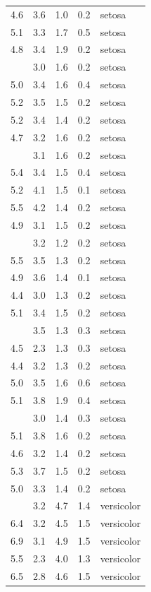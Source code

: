 \documentclass[
  12pt,
]{krantz}
\theoremstyle{definition}
\theoremstyle{definition}
\theoremstyle{definition}
\theoremstyle{definition}
\theoremstyle{remark}
\begin{document}
\begin{longtable}[t]{rrrrl}
4.6 & 3.6 & 1.0 & 0.2 & setosa\\
5.1 & 3.3 & 1.7 & 0.5 & setosa\\
4.8 & 3.4 & 1.9 & 0.2 & setosa\\
\addlinespace
5.0 & 3.0 & 1.6 & 0.2 & setosa\\
5.0 & 3.4 & 1.6 & 0.4 & setosa\\
5.2 & 3.5 & 1.5 & 0.2 & setosa\\
5.2 & 3.4 & 1.4 & 0.2 & setosa\\
4.7 & 3.2 & 1.6 & 0.2 & setosa\\
\addlinespace
4.8 & 3.1 & 1.6 & 0.2 & setosa\\
5.4 & 3.4 & 1.5 & 0.4 & setosa\\
5.2 & 4.1 & 1.5 & 0.1 & setosa\\
5.5 & 4.2 & 1.4 & 0.2 & setosa\\
4.9 & 3.1 & 1.5 & 0.2 & setosa\\
\addlinespace
5.0 & 3.2 & 1.2 & 0.2 & setosa\\
5.5 & 3.5 & 1.3 & 0.2 & setosa\\
4.9 & 3.6 & 1.4 & 0.1 & setosa\\
4.4 & 3.0 & 1.3 & 0.2 & setosa\\
5.1 & 3.4 & 1.5 & 0.2 & setosa\\
\addlinespace
5.0 & 3.5 & 1.3 & 0.3 & setosa\\
4.5 & 2.3 & 1.3 & 0.3 & setosa\\
4.4 & 3.2 & 1.3 & 0.2 & setosa\\
5.0 & 3.5 & 1.6 & 0.6 & setosa\\
5.1 & 3.8 & 1.9 & 0.4 & setosa\\
\addlinespace
4.8 & 3.0 & 1.4 & 0.3 & setosa\\
5.1 & 3.8 & 1.6 & 0.2 & setosa\\
4.6 & 3.2 & 1.4 & 0.2 & setosa\\
5.3 & 3.7 & 1.5 & 0.2 & setosa\\
5.0 & 3.3 & 1.4 & 0.2 & setosa\\
\addlinespace
7.0 & 3.2 & 4.7 & 1.4 & versicolor\\
6.4 & 3.2 & 4.5 & 1.5 & versicolor\\
6.9 & 3.1 & 4.9 & 1.5 & versicolor\\
5.5 & 2.3 & 4.0 & 1.3 & versicolor\\
6.5 & 2.8 & 4.6 & 1.5 & versicolor\\
\bottomrule
\end{longtable}
\end{document}
